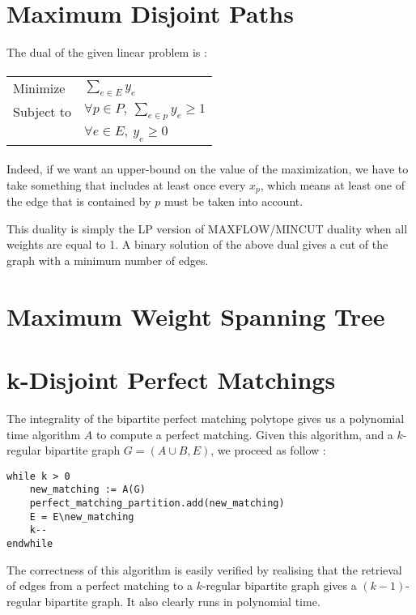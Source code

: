 \documentclass{scrartcl}
\newcommand\1{\mathbf{1}}
\begin{document}
\section{Maximum Disjoint Paths}

The dual of the given linear problem is :

\paragraph{}
\begin{tabular}{ll}
Minimize & $\sum_{e \in E} y_e$\\
Subject to & $\forall p \in P, \ \sum_{e \in p} y_e \geq 1$\\
& $\forall e \in E, \  y_e \geq 0$ \\
\end{tabular}
\paragraph{} 

Indeed, if we want an upper-bound on the value of the maximization, we have to take something that includes at least once every $x_p$, which means at least one of the edge that is contained by $p$ must be taken into account. 

This duality is simply the LP version of MAXFLOW/MINCUT duality when all weights are equal to 1. A binary solution of the above dual gives a cut of the graph with a minimum number of edges.

\section{Maximum Weight Spanning Tree}





\section{k-Disjoint Perfect Matchings}

The integrality of the bipartite perfect matching polytope gives us a polynomial time algorithm $A$ to compute a perfect matching. Given this algorithm, and a $k$-regular bipartite graph $G = (A \cup B,E)$, we proceed as follow :

\begin{verbatim}
while k > 0
    new_matching := A(G) 
    perfect_matching_partition.add(new_matching)
    E = E\new_matching
    k--
endwhile
\end{verbatim}

The correctness of this algorithm is easily verified by realising that the retrieval of edges from a perfect matching to a $k$-regular bipartite graph gives a $(k-1)$-regular bipartite graph. It also clearly runs in polynomial time.
\end{document}
